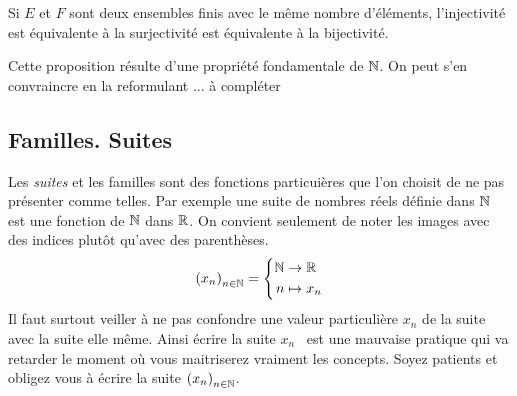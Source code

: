 \begin{propn}
 Si $E$ et $F$ sont deux ensembles finis avec le même nombre d'éléments, l'injectivité est équivalente à la surjectivité est équivalente à la bijectivité.
\end{propn}
\begin{demo}
  Cette proposition résulte d'une propriété fondamentale de $\mathbb{N}$. On peut s'en convraincre en la reformulant ... à compléter
\end{demo}

\subsection{Familles. Suites}
Les \emph{suites} et les familles sont des fonctions particuières que l'on choisit de ne pas présenter comme telles. \newline
Par exemple une suite de nombres réels définie dans $\mathbb{N}$ est une fonction de $\mathbb{N}$ dans $\mathbb{R}$. On convient seulement de noter les images avec des indices plutôt qu'avec des parenthèses.
\begin{displaymath}
  \left( x_n\right)_{n\in \mathbb{N}} = 
  \left\lbrace 
  \begin{aligned}
    \mathbb{N} &\rightarrow \mathbb{R} \\ n &\mapsto x_n
  \end{aligned}
\right. 
\end{displaymath}
Il faut surtout veiller à ne pas confondre une valeur particulière $x_n$ de la suite avec la suite elle même.
Ainsi écrire \og la suite $x_n$\fg~ est une mauvaise pratique qui va retarder le moment où vous maitriserez vraiment les concepts. Soyez patients et obligez vous à écrire \og la suite $\left( x_n\right)_{n\in \mathbb{N}}$\fg.

